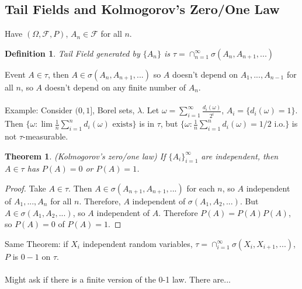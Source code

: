 \documentclass[12pt]{article}
\newtheorem{theorem}{Theorem}
\newtheorem{defn}{Definition}
\begin{document}
\subsection{Tail Fields and Kolmogorov's Zero/One Law}
Have $(\Omega, \mathcal{F}, P)$, $A_n \in \mathcal{F}$ for all $n$.
\begin{defn}
Tail Field generated by $\{ A_n \}$ is $\tau = \cap_{n=1}^\infty \sigma(A_n, A_{n+1}, ...)$
\end{defn}
Event $A \in \tau$, then $A \in \sigma(A_n, A_{n+1}, ...)$ so $A$ doesn't depend on $A_1, ..., A_{n-1}$ for all $n$, so $A$ doesn't depend on any finite number of $A_n$.
\\ \\
Example: Consider $(0, 1]$, Borel sets, $\lambda$.  Let $\omega = \sum_{i=1}^\infty \frac{d_i(\omega)}{2^i}$, $A_i = \{ d_i(\omega) = 1\}$.  Then $\{ \omega : \lim \frac{1}{n} \sum_{i=1}^n d_i(\omega) \textrm{ exists} \}$ is in $\tau$, but $\{ \omega : \frac{1}{n} \sum_{i=1}^n d_i(\omega) = 1/2 \textrm{ i.o.}\}$ is not $\tau$-measurable.
\begin{theorem}
(Kolmogorov's zero/one law) If $\{A_i\}_{i=1}^\infty$ are independent, then $A \in \tau$ has $P(A) = 0$ or $P(A) = 1$.
\end{theorem}
\begin{proof}
Take $A \in \tau$.  Then $A \in \sigma(A_{n+1}, A_{n+1}, ...)$ for each $n$, so $A$ independent of $A_1, ..., A_n$ for all $n$.  Therefore, $A$ independent of $\sigma(A_1, A_2, ...)$.  But $A \in \sigma(A_1, A_2, ...)$, so $A$ independent of $A$.  Therefore $P(A) = P(A) P(A)$, so $P(A) = 0$ of $P(A) = 1$.
\end{proof}
Same Theorem: if $X_i$ independent random variables, $\tau = \cap_{i=1}^\infty \sigma(X_i, X_{i+1}, ...)$, $P$ is $0-1$ on $\tau$.
\\ \\
Might ask if there is a finite version of the 0-1 law.  There are...
\\ \\
\end{document}
